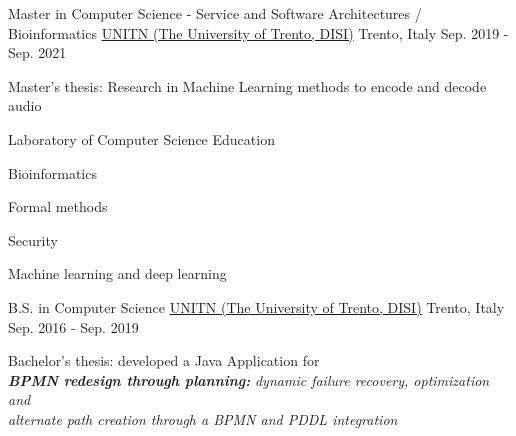 

\begin{cventries}


  \cventry
    {Master in Computer Science - Service and Software Architectures / Bioinformatics} %
    {\href{https://www.unitn.it/}{UNITN (The University of Trento, DISI)}}  %
    {Trento, Italy} %
    {Sep. 2019 - Sep. 2021} %
    {
      \begin{cvitems} %
        \item {Master's thesis: Research in Machine Learning methods to encode and decode audio}
        \item {Laboratory of Computer Science Education}
        \item {Bioinformatics}
        \item {Formal methods}
        \item {Security}
        \item {Machine learning and deep learning}
      \end{cvitems}
    }

  \cventry
    {B.S. in Computer Science} %
    {\href{https://www.unitn.it/}{UNITN (The University of Trento, DISI)}}  %
    {Trento, Italy} %
    {Sep. 2016 - Sep. 2019} %
    {
      \begin{cvitems} %
        \item {Bachelor's thesis: developed a Java Application for \\ \textbf{\textit{BPMN redesign through planning:}} \textit{dynamic failure recovery, optimization and} \\ \textit{alternate path creation through a BPMN and PDDL integration}}
      \end{cvitems}
    }


\end{cventries}
